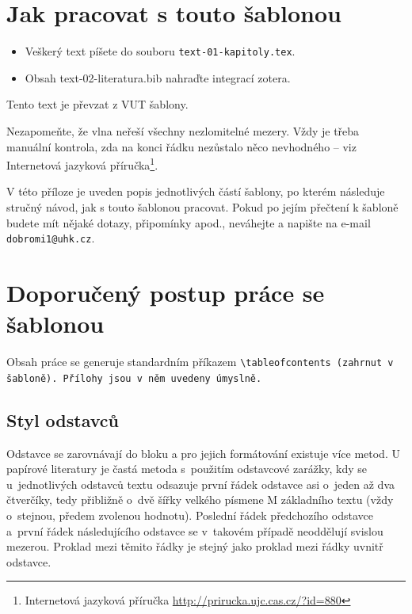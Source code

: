 \section{Jak pracovat s touto šablonou}
\label{jak}

\begin{Large}
  \begin{itemize}
    \item Veškerý text píšete do souboru \texttt{text-01-kapitoly.tex}.
    \item Obsah text-02-literatura.bib nahraďte integrací zotera.
  \end{itemize}
\end{Large}

Tento text je převzat z VUT šablony.

Nezapomeňte, že vlna neřeší všechny nezlomitelné mezery. Vždy je třeba manuální kontrola, zda na konci řádku nezůstalo něco nevhodného -- viz Internetová jazyková příručka\footnote{Internetová jazyková příručka \url{http://prirucka.ujc.cas.cz/?id=880}}.

V této příloze je uveden popis jednotlivých částí šablony, po kterém následuje stručný návod, jak s touto šablonou pracovat. Pokud po jejím přečtení k šabloně budete mít nějaké dotazy, připomínky apod., neváhejte a napište na e-mail \texttt{dobromi1@uhk.cz}.


\section*{Doporučený postup práce se šablonou}

Obsah práce se generuje standardním příkazem \tt \textbackslash tableofcontents \rm (zahrnut v šabloně). Přílohy jsou v něm uvedeny úmyslně.

\subsection*{Styl odstavců}

Odstavce se zarovnávají do bloku a pro jejich formátování existuje více metod. U papírové literatury je častá metoda s~použitím odstavcové zarážky, kdy se u~jednotlivých odstavců textu odsazuje první řádek odstavce asi o~jeden až dva čtverčíky, tedy přibližně o~dvě šířky velkého písmene M základního textu (vždy o~stejnou, předem zvolenou hodnotu). Poslední řádek předchozího odstavce a~první řádek následujícího odstavce se v~takovém případě neoddělují svislou mezerou. Proklad mezi těmito řádky je stejný jako proklad mezi řádky uvnitř odstavce.

